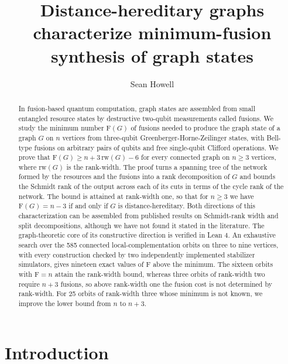\documentclass[aps,pra,onecolumn,superscriptaddress,nofootinbib,longbibliography]{revtex4-2}
\theoremstyle{plain}
\theoremstyle{remark}
\newcommand{\F}{\mathrm{F}}
\newcommand{\rw}{\mathrm{rw}}
\begin{document}
\title{Distance-hereditary graphs characterize minimum-fusion synthesis of graph states}

\author{Sean Howell}

\begin{abstract}
In fusion-based quantum computation, graph states are assembled from small entangled resource
states by destructive two-qubit measurements called fusions. We study the minimum number $\F(G)$ of
fusions needed to produce the graph state of a graph $G$ on $n$ vertices from three-qubit
Greenberger-Horne-Zeilinger states, with Bell-type fusions on arbitrary pairs of qubits and free
single-qubit Clifford operations. We prove that $\F(G)\ge n+3\,\rw(G)-6$ for every connected graph
on $n\ge 3$ vertices, where $\rw(G)$ is the rank-width. The proof turns a spanning tree of the
network formed by the resources and the fusions into a rank decomposition of $G$ and bounds the Schmidt
rank of the output across each of its cuts in terms of the cycle rank of the network. The bound is
attained at rank-width one, so that for $n\ge 3$ we have $\F(G)=n-3$ if and only if $G$ is
distance-hereditary. Both directions of this characterization can be assembled from published results
on Schmidt-rank width and split decompositions, although we have not found it stated in the literature.
The graph-theoretic core of its constructive direction is verified in Lean 4. An exhaustive
search over the 585 connected local-complementation orbits on three to nine vertices, with every
construction checked by two independently implemented stabilizer simulators, gives nineteen exact
values of $\F$ above the minimum. The sixteen orbits with $\F=n$ attain the rank-width bound, whereas
three orbits of rank-width two require $n+3$ fusions, so above rank-width one the fusion cost is not
determined by rank-width. For 25 orbits of rank-width three whose minimum is not known, we improve the
lower bound from $n$ to $n+3$.
\end{abstract}

\maketitle

\section{Introduction}\label{sec:intro}
\end{document}
